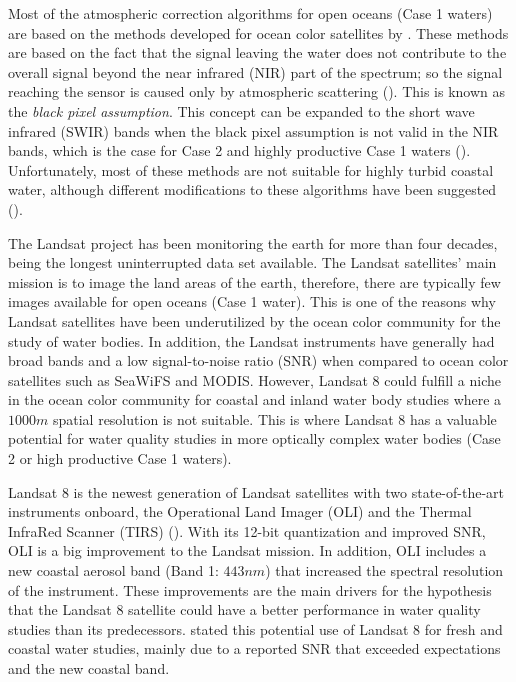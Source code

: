 \documentclass[onecolumn,3p,letterpaper]{elsarticle}
\begin{document}
Most of the atmospheric correction algorithms for open oceans (Case 1 waters) are based on the methods developed for ocean color satellites by \cite{Gordon:1997}. These methods are based on the fact that the signal leaving the water does not contribute to the overall signal beyond the near infrared (NIR) part of the spectrum; so the signal reaching the sensor is caused only by atmospheric scattering (\cite{Gordon:1994}). This is known as the {\it black pixel assumption}. This concept can be expanded to the short wave infrared (SWIR) bands when the black pixel assumption is not valid in the NIR bands, which is the case for Case 2 and highly productive Case 1 waters (\cite{Wang:2007}). Unfortunately, most of these methods are not suitable for highly turbid coastal water, although different modifications to these algorithms have been suggested (\cite{Patt2003}).

The Landsat project has been monitoring the earth for more than four decades, being the longest uninterrupted data set available. The Landsat satellites' main mission is to image the land areas of the earth, therefore, there are typically few images available for open oceans (Case 1 water). This is one of the reasons why Landsat satellites have been underutilized by the ocean color community for the study of water bodies. In addition, the Landsat instruments have generally had broad bands and a low signal-to-noise ratio (SNR) when compared to ocean color satellites such as SeaWiFS and MODIS. However, Landsat 8 could fulfill a niche in the ocean color community for coastal and inland water body studies where a $1000m$ spatial resolution is not suitable. This is where Landsat 8 has a valuable potential for water quality studies in more optically complex water bodies (Case 2 or high productive Case 1 waters). 

Landsat 8 is the newest generation of Landsat satellites with two state-of-the-art instruments onboard, the Operational Land Imager (OLI) and the Thermal InfraRed Scanner (TIRS) (\cite{Irons:2012}). With its 12-bit quantization and improved SNR, OLI is a big improvement to the Landsat mission. In addition, OLI includes a new coastal aerosol band (Band 1: $443nm$) that increased the spectral resolution of the instrument. These improvements are the main drivers for the hypothesis that the Landsat 8 satellite could have a better performance in water quality studies than its predecessors. \cite{Roy:2014} stated this potential use of Landsat 8 for fresh and coastal water studies, mainly due to a reported SNR that exceeded expectations and the new coastal band. 
\end{document}
